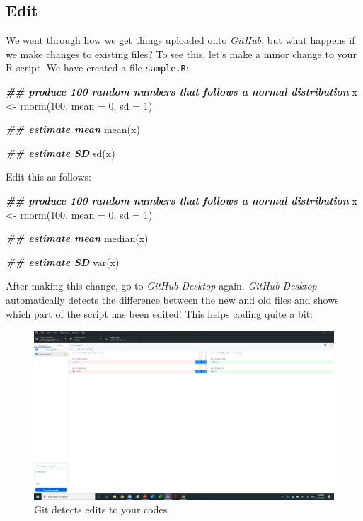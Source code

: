 \documentclass[
]{book}
\newenvironment{Shaded}{\begin{snugshade}}{\end{snugshade}}
\newcommand{\AttributeTok}[1]{\textcolor[rgb]{0.77,0.63,0.00}{#1}}
\newcommand{\DecValTok}[1]{\textcolor[rgb]{0.00,0.00,0.81}{#1}}
\newcommand{\DocumentationTok}[1]{\textcolor[rgb]{0.56,0.35,0.01}{\textbf{\textit{#1}}}}
\newcommand{\FunctionTok}[1]{\textcolor[rgb]{0.00,0.00,0.00}{#1}}
\newcommand{\NormalTok}[1]{#1}
\newcommand{\OtherTok}[1]{\textcolor[rgb]{0.56,0.35,0.01}{#1}}
\begin{document}
\hypertarget{edit}{%
\subsection{Edit}\label{edit}}

We went through how we get things uploaded onto \emph{GitHub}, but what happens if we make changes to existing files? To see this, let's make a minor change to your R script. We have created a file \texttt{sample.R}:

\begin{Shaded}
\begin{Highlighting}[]
\DocumentationTok{\#\# produce 100 random numbers that follows a normal distribution}
\NormalTok{x }\OtherTok{\textless{}{-}} \FunctionTok{rnorm}\NormalTok{(}\DecValTok{100}\NormalTok{, }\AttributeTok{mean =} \DecValTok{0}\NormalTok{, }\AttributeTok{sd =} \DecValTok{1}\NormalTok{)}

\DocumentationTok{\#\# estimate mean}
\FunctionTok{mean}\NormalTok{(x)}

\DocumentationTok{\#\# estimate SD}
\FunctionTok{sd}\NormalTok{(x)}
\end{Highlighting}
\end{Shaded}

Edit this as follows:

\begin{Shaded}
\begin{Highlighting}[]
\DocumentationTok{\#\# produce 100 random numbers that follows a normal distribution}
\NormalTok{x }\OtherTok{\textless{}{-}} \FunctionTok{rnorm}\NormalTok{(}\DecValTok{100}\NormalTok{, }\AttributeTok{mean =} \DecValTok{0}\NormalTok{, }\AttributeTok{sd =} \DecValTok{1}\NormalTok{)}

\DocumentationTok{\#\# estimate mean}
\FunctionTok{median}\NormalTok{(x)}

\DocumentationTok{\#\# estimate SD}
\FunctionTok{var}\NormalTok{(x)}
\end{Highlighting}
\end{Shaded}

After making this change, go to \emph{GitHub Desktop} again. \emph{GitHub Desktop} automatically detects the difference between the new and old files and shows which part of the script has been edited! This helps coding quite a bit:

\begin{figure}

{\centering \includegraphics[width=61.11in]{image/git_image06} 

}

\caption{Git detects edits to your codes}\label{fig:gitdesktop5}
\end{figure}
\end{document}
